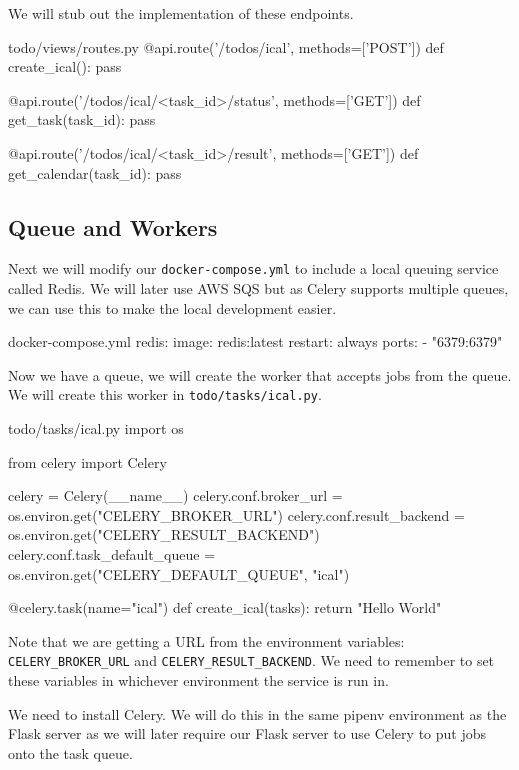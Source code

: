 \documentclass{csse4400}
\begin{document}
We will stub out the implementation of these endpoints.

\begin{code}[language=python,numbers=none]{todo/views/routes.py}
@api.route('/todos/ical', methods=['POST'])
def create_ical():
    pass

@api.route('/todos/ical/<task_id>/status', methods=['GET'])
def get_task(task_id):
    pass

@api.route('/todos/ical/<task_id>/result', methods=['GET'])
def get_calendar(task_id):
    pass
\end{code}

\subsection{Queue and Workers}

Next we will modify our \texttt{docker-compose.yml} to include a local queuing service called Redis.
We will later use AWS SQS but as Celery supports multiple queues,
we can use this to make the local development easier.

\begin{code}[numbers=none]{docker-compose.yml}
  redis:
    image: redis:latest
    restart: always
    ports:
      - "6379:6379"
\end{code}

Now we have a queue,
we will create the worker that accepts jobs from the queue.
We will create this worker in \texttt{todo/tasks/ical.py}.

\begin{code}[language=python,numbers=none]{todo/tasks/ical.py}
import os

from celery import Celery

celery = Celery(__name__)
celery.conf.broker_url = os.environ.get("CELERY_BROKER_URL")
celery.conf.result_backend = os.environ.get("CELERY_RESULT_BACKEND")
celery.conf.task_default_queue = os.environ.get("CELERY_DEFAULT_QUEUE", "ical")

@celery.task(name="ical")
def create_ical(tasks):
    return "Hello World"
\end{code}

Note that we are getting a URL from the environment variables:
\texttt{CELERY\_BROKER\_URL} and \texttt{CELERY\_RESULT\_BACKEND}.
We need to remember to set these variables in whichever environment the service is run in.

We need to install Celery.
We will do this in the same pipenv environment as the Flask server as we will later require our Flask server to use Celery to put jobs onto the task queue.
\end{document}
